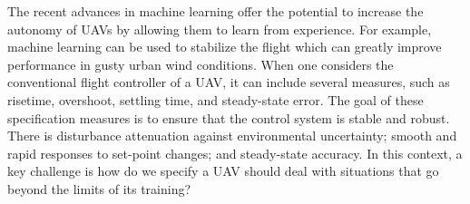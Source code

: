 \documentclass[sigconf]{acmart}
\begin{document}
The recent advances in machine learning offer the potential to increase the autonomy of UAVs by allowing them to learn from experience. For example, machine learning can be used to stabilize the flight which can greatly improve performance in gusty urban wind conditions. 
When one considers the conventional flight controller of a UAV, it can include several measures, such as risetime, overshoot, settling time, and steady-state error.
The goal of these specification measures is to ensure that the control system is stable and robust. 
There is disturbance attenuation against environmental uncertainty; smooth and rapid responses to set-point changes; and steady-state accuracy. 
In this context, a key challenge is how do we specify a UAV should deal with situations that go beyond the limits of its training?


%
%
%
%
%

%
%
%
%
%
%
\end{document}

